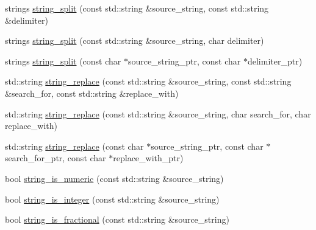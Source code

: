 \begin{DoxyCompactItemize}
strings \hyperlink{namespacextd_1_1str_a94ab05421170b46d98baffd7fbd04ae5}{string\-\_\-split} (const std\-::string \&source\-\_\-string, const std\-::string \&delimiter)
\item 
strings \hyperlink{namespacextd_1_1str_a06656216ad0df88bb608e00aaa18eb82}{string\-\_\-split} (const std\-::string \&source\-\_\-string, char delimiter)
\item 
strings \hyperlink{namespacextd_1_1str_a1e141ef588bb3f2a3f586306377c0ad0}{string\-\_\-split} (const char $\ast$source\-\_\-string\-\_\-ptr, const char $\ast$delimiter\-\_\-ptr)
\item 
std\-::string \hyperlink{namespacextd_1_1str_a73aeee14b743df341c1b4a66199aa2c2}{string\-\_\-replace} (const std\-::string \&source\-\_\-string, const std\-::string \&search\-\_\-for, const std\-::string \&replace\-\_\-with)
\item 
std\-::string \hyperlink{namespacextd_1_1str_a76165b3eb4c578f41e935796ed4918c2}{string\-\_\-replace} (const std\-::string \&source\-\_\-string, char search\-\_\-for, char replace\-\_\-with)
\item 
std\-::string \hyperlink{namespacextd_1_1str_a68fc51d9da10cd350332c3b29633088c}{string\-\_\-replace} (const char $\ast$source\-\_\-string\-\_\-ptr, const char $\ast$search\-\_\-for\-\_\-ptr, const char $\ast$replace\-\_\-with\-\_\-ptr)
\item 
bool \hyperlink{namespacextd_1_1str_a6d1ae5acb732d24d3be7d1bc4baa7c47}{string\-\_\-is\-\_\-numeric} (const std\-::string \&source\-\_\-string)
\item 
bool \hyperlink{namespacextd_1_1str_a3b3cf2660283d567c5c46bafd478123e}{string\-\_\-is\-\_\-integer} (const std\-::string \&source\-\_\-string)
\item 
bool \hyperlink{namespacextd_1_1str_a96ed87d80d055426e2a127049168552c}{string\-\_\-is\-\_\-fractional} (const std\-::string \&source\-\_\-string)
\end{DoxyCompactItemize}


